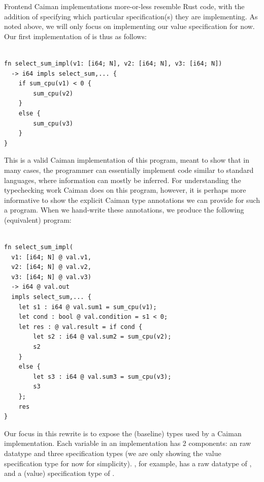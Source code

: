 Frontend Caiman implementations more-or-less resemble Rust code, with the addition of specifying which particular specification(s) they are implementing.  As noted above, we will only focus on implementing our value specification for now.  Our first implementation of  is thus as follows:
%
\begin{lstlisting}

fn select_sum_impl(v1: [i64; N], v2: [i64; N], v3: [i64; N]) 
  -> i64 impls select_sum,... {
    if sum_cpu(v1) < 0 { 
        sum_cpu(v2)
    }
    else {
        sum_cpu(v3)
    }
}
\end{lstlisting}
%
This is a valid Caiman implementation of this program, meant to show that in many cases, the programmer can essentially implement code similar to standard languages, where information can mostly be inferred.  For understanding the typechecking work Caiman does on this program, however, it is perhaps more informative to show the explicit Caiman type annotations we can provide for such a program.  When we hand-write these annotations, we produce the following (equivalent) program:
%
\begin{lstlisting}

fn select_sum_impl(
  v1: [i64; N] @ val.v1,
  v2: [i64; N] @ val.v2,
  v3: [i64; N] @ val.v3)
  -> i64 @ val.out
  impls select_sum,... {
    let s1 : i64 @ val.sum1 = sum_cpu(v1);
    let cond : bool @ val.condition = s1 < 0;
    let res : @ val.result = if cond {
        let s2 : i64 @ val.sum2 = sum_cpu(v2);
        s2
    }
    else {
        let s3 : i64 @ val.sum3 = sum_cpu(v3);
        s3
    };
    res
}
\end{lstlisting}
%
Our focus in this rewrite is to expose the (baseline) types used by a Caiman implementation.  Each variable in an implementation has 2 components: an raw datatype and three specification types (we are only showing the value specification type for now for simplicity).  , for example, has a raw datatype of , and a (value) specification type of .

